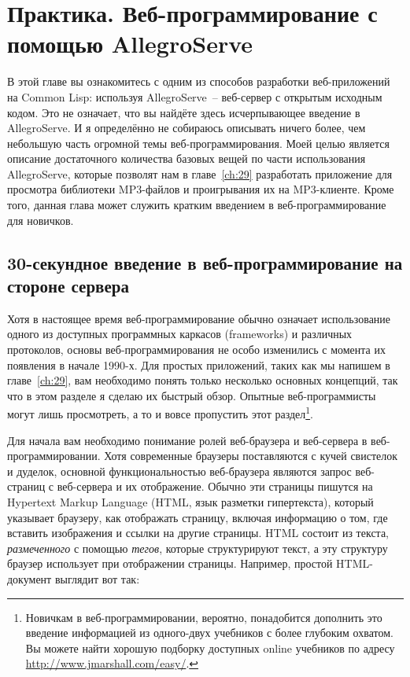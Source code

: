 \chapter{Практика. Веб-программирование с помощью AllegroServe}
\label{ch:26}

\thispagestyle{empty}

В этой главе вы ознакомитесь с одним из способов разработки веб-приложений на Common Lisp:
используя AllegroServe~-- веб-сервер с открытым исходным кодом. Это не означает, что вы
найдёте здесь исчерпывающее введение в AllegroServe. И я определённо не собираюсь
описывать ничего более, чем небольшую часть огромной темы веб-программирования. Моей целью
является описание достаточного количества базовых вещей по части использования
AllegroServe, которые позволят нам в главе~\ref{ch:29} разработать приложение для
просмотра библиотеки MP3-файлов и проигрывания их на MP3-клиенте. Кроме того, данная глава
может служить кратким введением в веб-программирование для новичков.

\section{30-секундное введение в веб-программирование на стороне сервера}

Хотя в настоящее время веб-программирование обычно означает использование одного из
доступных программных каркасов (frameworks) и различных протоколов, основы
веб-программирования не особо изменились с момента их появления в начале 1990-х. Для
простых приложений, таких как мы напишем в главе~\ref{ch:29}, вам необходимо понять только
несколько основных концепций, так что в этом разделе я сделаю их быстрый обзор. Опытные
веб-программисты могут лишь просмотреть, а то и вовсе пропустить этот
раздел\footnote{Новичкам в веб-программировании, вероятно, понадобится дополнить это
  введение информацией из одного-двух учебников с более глубоким охватом. Вы можете найти
  хорошую подборку доступных online учебников по адресу
  \url{http://www.jmarshall.com/easy/}.}.

Для начала вам необходимо понимание ролей веб-браузера и веб-сервера в
веб-программировании. Хотя современные браузеры поставляются с кучей свистелок и дуделок,
основной функциональностью веб-браузера являются запрос веб-страниц с веб-сервера и их
отображение. Обычно эти страницы пишутся на Hypertext Markup Language (HTML, язык разметки
гипертекста), который указывает браузеру, как отображать страницу, включая информацию о
том, где вставить изображения и ссылки на другие страницы. HTML состоит из текста,
\textit{размеченного} с помощью \textit{тегов}, которые структурируют текст, а эту
структуру браузер использует при отображении страницы. Например, простой HTML-документ
выглядит вот так:

